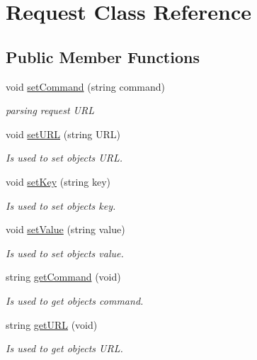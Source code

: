 \hypertarget{classRequest}{}\section{Request Class Reference}
\label{classRequest}
\subsection*{Public Member Functions}
\begin{DoxyCompactItemize}
\item 
void \hyperlink{classRequest_a4fe67f0c9cccfd530174eb3d8fb54013}{set\+Command} (string command)
\begin{DoxyCompactList}\small\item\em parsing request U\+RL \end{DoxyCompactList}\item 
void \hyperlink{classRequest_a1a46a4b8f73d3eb03c39ada91b26eeed}{set\+U\+RL} (string U\+RL)
\begin{DoxyCompactList}\small\item\em Is used to set object\textquotesingle{}s U\+RL. \end{DoxyCompactList}\item 
void \hyperlink{classRequest_a56210902bb0d240b4615d6fde144ea42}{set\+Key} (string key)
\begin{DoxyCompactList}\small\item\em Is used to set object\textquotesingle{}s key. \end{DoxyCompactList}\item 
void \hyperlink{classRequest_a2f8dbfdcbf1d9f07e8d1aa7216b044e3}{set\+Value} (string value)
\begin{DoxyCompactList}\small\item\em Is used to set object\textquotesingle{}s value. \end{DoxyCompactList}\item 
string \hyperlink{classRequest_a95ef26627def0c193c332b9bfd4ebf8e}{get\+Command} (void)
\begin{DoxyCompactList}\small\item\em Is used to get objects\textquotesingle{} command. \end{DoxyCompactList}\item 
string \hyperlink{classRequest_a49d0bafc034c350c8af8c3bb666e0099}{get\+U\+RL} (void)
\begin{DoxyCompactList}\small\item\em Is used to get objects\textquotesingle{} U\+RL. \end{DoxyCompactList}\item 

\end{DoxyCompactItemize}

